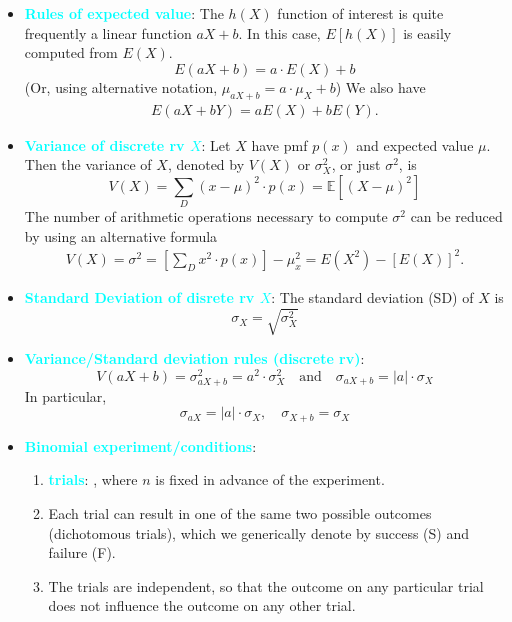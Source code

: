 \documentclass{report}
\begin{document}
\begin{itemize}
    \item \textbf{\textcolor{cyan}{Rules of expected value}}:
        The \(h(X)\) function of interest is quite frequently a linear function \(aX + b\). In this case, \(E[h(X)]\) is easily computed from \(E(X)\).
        \[
            E(aX + b) = a \cdot E(X) + b
        \]
        (Or, using alternative notation, \(\mu_{aX+b} = a \cdot \mu_X + b\))
        \bigbreak \noindent 
        We also have
        \begin{align*}
            E(aX + bY) = aE(X) + bE(Y)
        .\end{align*}
    \item \textbf{\textcolor{cyan}{Variance of discrete rv $X$}}:
        Let \( X \) have pmf \( p(x) \) and expected value \( \mu \). Then the variance of \( X \), denoted by \( V(X) \) or \( \sigma_X^2 \), or just \( \sigma^2 \), is
        \[
            V(X) = \sum_{D} (x - \mu)^2 \cdot p(x) = \mathbb{E}[(X - \mu)^2]
        \]
        \bigbreak \noindent 
        The number of arithmetic operations necessary to compute $\sigma^{2}$ can be reduced by using an alternative formula
        \begin{align*}
            V(X) = \sigma^{2} = \left[\sum_D x^{2} \cdot p(x)\right] - \mu_{x}^{2} = E(X^{2}) - [E(X)]^{2}
        .\end{align*}
    \item \textbf{\textcolor{cyan}{Standard Deviation of disrete rv $X$}}:
        The standard deviation (SD) of \( X \) is
        \[
            \sigma_X = \sqrt{\sigma_X^2}
        \]
    \item \textbf{\textcolor{cyan}{Variance/Standard deviation rules (discrete rv)}}:
        \[
            V(aX + b) = \sigma_{aX+b}^2 = a^2 \cdot \sigma_X^2 \quad \text{and} \quad \sigma_{aX+b} = |a| \cdot \sigma_X
        \]
        In particular,
        \[
            \sigma_{aX} = |a| \cdot \sigma_X, \quad \sigma_{X+b} = \sigma_X
        \]
    \item \textbf{\textcolor{cyan}{Binomial experiment/conditions}}:
        \begin{enumerate}
            \item \textbf{\textcolor{cyan}{trials}}: , where $n$ is fixed in advance of the experiment.
            \item Each trial can result in one of the same two possible outcomes (dichotomous trials), which we generically denote by success (S) and failure (F).
            \item The trials are independent, so that the outcome on any particular trial does not influence the outcome on any other trial.

\end{enumerate}
\end{itemize}
\end{document}
